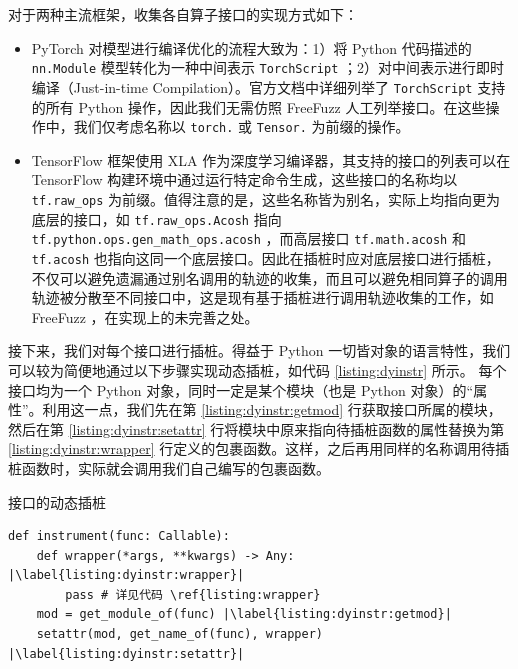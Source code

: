 对于两种主流框架，收集各自算子接口的实现方式如下：
\begin{itemize}
    \item PyTorch 对模型进行编译优化的流程大致为：1）将 Python 代码描述的 \texttt{nn.Module} 模型转化为一种中间表示 \texttt{TorchScript} ；2）对中间表示进行即时编译（Just-in-time Compilation）。官方文档\cite{torch_ops_doc}中详细列举了 \texttt{TorchScript} 支持的所有 Python 操作，因此我们无需仿照 FreeFuzz 人工列举接口。在这些操作中，我们仅考虑名称以 \texttt{torch.} 或 \texttt{Tensor.} 为前缀的操作。
    
    \item TensorFlow 框架使用 XLA 作为深度学习编译器，其支持的接口的列表可以在 TensorFlow 构建环境中通过运行特定命令生成\cite{tf_ops_doc}，这些接口的名称均以 \texttt{tf.raw\_ops} 为前缀。值得注意的是，这些名称皆为别名，实际上均指向更为底层的接口，如 \texttt{tf.raw\_ops.Acosh} 指向 \texttt{tf.python.ops.gen\_math\_ops.acosh} ，而高层接口 \texttt{tf.math.acosh} 和 \texttt{tf.acosh} 也指向这同一个底层接口。因此在插桩时应对底层接口进行插桩，不仅可以避免遗漏通过别名调用的轨迹的收集，而且可以避免相同算子的调用轨迹被分散至不同接口中，这是现有基于插桩进行调用轨迹收集的工作，如 FreeFuzz ，在实现上的未完善之处。
\end{itemize}

接下来，我们对每个接口进行插桩。得益于 Python 一切皆对象的语言特性，我们可以较为简便地通过以下步骤实现动态插桩，如代码 \ref{listing:dyinstr} 所示。
每个接口均为一个 Python 对象，同时一定是某个模块（也是 Python 对象）的“属性”。利用这一点，我们先在第 \ref{listing:dyinstr:getmod} 行获取接口所属的模块，然后在第 \ref{listing:dyinstr:setattr} 行将模块中原来指向待插桩函数的属性替换为第 \ref{listing:dyinstr:wrapper} 行定义的包裹函数。这样，之后再用同样的名称调用待插桩函数时，实际就会调用我们自己编写的包裹函数。

\begin{listing}[]
    \caption{接口的动态插桩}
    \label{listing:dyinstr}
\begin{verbatim}
def instrument(func: Callable):
    def wrapper(*args, **kwargs) -> Any: |\label{listing:dyinstr:wrapper}|
        pass # 详见代码 \ref{listing:wrapper}
    mod = get_module_of(func) |\label{listing:dyinstr:getmod}|
    setattr(mod, get_name_of(func), wrapper) |\label{listing:dyinstr:setattr}|
\end{verbatim}
\end{listing}

